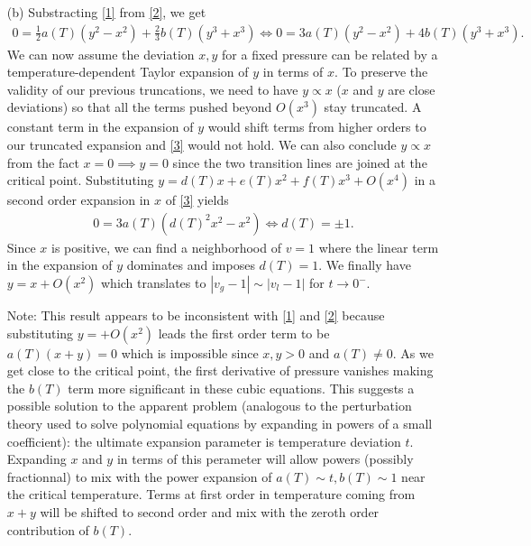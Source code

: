 \documentclass[10pt, a4paper]{article}
\begin{document}
{\begin{enumerate}
  \item[(b)] Substracting \eqref{1} from \eqref{2}, we get 
  \begin{align*}
    0 = \frac{1}{2}a(T) (y^2 - x^2) + \frac{2}{3}b(T) (y^3 + x^3) \iff 0 = 3a(T) (y^2 - x^2) + 4 b(T) (y^3 + x^3).  \tag{$\star\star\star$} \label{3}
  \end{align*}
  We can now assume the deviation $x, y$ for a fixed pressure can be related by a temperature-dependent Taylor expansion of $y$ in terms of $x$. To preserve the validity of our previous truncations, we need to have $y \propto x$ ($x$ and $y$ are close deviations) so that all the terms pushed beyond $O(x^3)$ stay truncated. A constant term in the expansion of $y$ would shift terms from higher orders to our truncated expansion and \eqref{3} would not hold. We can also conclude $y \propto x$ from the fact $x=0 \implies y=0$ since the two transition lines are joined at the critical point. Substituting $y = d(T) x + e(T) x^2 + f(T) x^3 + O(x^4)$ in a second order expansion in $x$ of \eqref{3} yields 
  \begin{align*}
    0 = 3a(T) (d(T)^2 x^2 - x^2) \iff d(T) = \pm 1. 
  \end{align*}
  Since $x$ is positive, we can find a neighborhood of $v=1$ where the linear term in the expansion of $y$ dominates and imposes $d(T) = 1$. We finally have $y = x + O(x^2)$ which translates to $|v_g-1| \sim |v_l-1|$ for $t \to 0^-$.

  Note: This result appears to be inconsistent with \eqref{1} and \eqref{2} because substituting $y =  + O(x^2)$ leads the first order term to be $a(T)(x + y) = 0$ which is impossible since $x, y > 0$ and $a(T) \neq 0$. As we get close to the critical point, the first derivative of pressure vanishes making the $b(T)$ term more significant in these cubic equations. This suggests a possible solution to the apparent problem (analogous to the perturbation theory used to solve polynomial equations by expanding in powers of a small coefficient): the ultimate expansion parameter is temperature deviation $t$. Expanding $x$ and $y$ in terms of this perameter will allow powers (possibly fractionnal) to mix with the power expansion of $a(T)\sim t, b(T)\sim 1$ near the critical temperature. Terms at first order in temperature coming from $x+y$ will be shifted to second order and mix with the zeroth order contribution of $b(T)$.
\end{enumerate}

}
\end{document}

